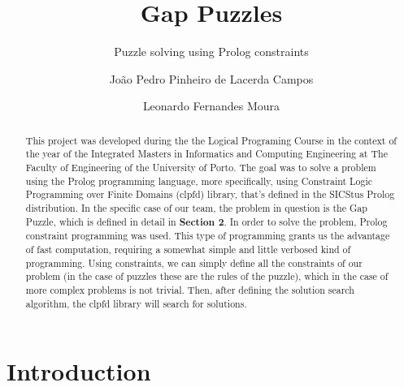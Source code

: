 \documentclass[runningheads]{llncs}
\begin{document}
%
\title{Gap Puzzles}

\subtitle{Puzzle solving using Prolog constraints}
%
%
\author{João Pedro Pinheiro de Lacerda Campos \and
Leonardo Fernandes Moura}
%
%


%
\maketitle              %
%
\begin{abstract}
This project was developed during the the Logical Programing Course in the context of the year
of the Integrated Masters in Informatics and Computing Engineering at The Faculty of Engineering
of the University of Porto. The goal was to solve a problem using the Prolog programming language,
more specifically, using Constraint Logic Programming over Finite Domains (clpfd) library, that's defined
in the SICStus Prolog distribution.
In the specific case of our team, the problem in question is the Gap Puzzle, which is defined in detail in
\textbf{Section 2}.
In order to solve the problem, Prolog constraint programming was used. This type of programming grants us the
advantage of fast computation, requiring a somewhat simple and little verbosed kind of programming. Using constraints,
we can simply define all the constraints of our problem (in the case of puzzles these are the rules of the puzzle),
which in the case of more complex problems is not trivial. Then, after defining the solution search algorithm,
the clpfd library will search for solutions.


\end{abstract}

\pagebreak

\section{Introduction}
\end{document}
